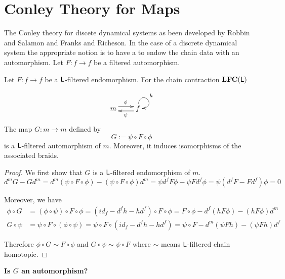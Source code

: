 
\section{Conley Theory for Maps}\label{sec:maps}

The Conley theory for discete dynamical systems as been developed by Robbin and Salamon and Franks and Richeson.
In the case of a discrete dynamical system the appropriate notion is to have a to endow the chain data with an automorphism.    Let $F:f\to f$ be a filtered automorphism.
\begin{prop}
Let $F\colon f\to f$ be a ${\mathsf L}$-filtered endomorphism.  For the chain contraction ${\bf LFC}({\mathsf L})$

\[
\xymatrixrowsep{0.03in}
\xymatrixcolsep{0.3in}
\xymatrix{
m  \ar[r]<3pt>^{\phi} & \ar[l]<3pt>^{\psi} f \ar@(u,r)^{h}
}
\]
The map $G\colon m\to m$ defined by 
\[
G:= \psi\circ F \circ  \phi
\]
is a ${\mathsf L}$-filtered automorphism of $m$.  Moreover, it induces isomorphisms of the associated braids.
\end{prop}
\begin{proof}
We first show that $G$ is a ${\mathsf L}$-filtered endomorphism of $m$.
\[
d^m G - G d^m = d^m (\psi\circ  F\circ \phi) - (\psi \circ F\circ  \phi) d^m = \psi d^f F \phi - \psi F d^f \phi = \psi(d^f F- F d^f)\phi = 0
\]

Moreover, we have 
\begin{align*}
\phi \circ G &= (\phi \circ \psi) \circ F\circ \phi = (id_f-d^fh-hd^f) \circ F \circ \phi = F\circ \phi - d^f(hF\phi) - (hF\phi)d^m\\
G \circ \psi &= \psi \circ F\circ (\phi \circ \psi) =  \psi \circ F \circ (id_f-d^f h - hd^f) = \psi\circ F -  d^m( \psi F h) - (\psi F h )d^f
\end{align*}

Therefore $\phi\circ G\sim F\circ \phi$ and $G\circ \psi \sim \psi \circ F$ where $\sim$ means ${\mathsf L}$-filtered chain homotopic.  


\end{proof}

{\bf Is $G$ an automorphism?}


%
%
%
%
%
%

